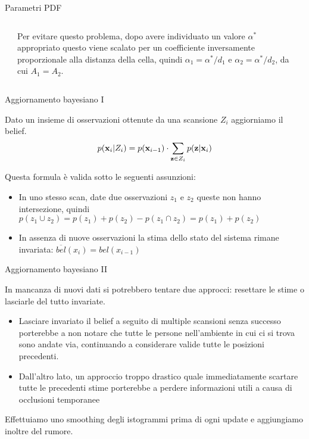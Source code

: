 \documentclass[aspectratio=169, leqno]{beamer}
\begin{document}
\begin{frame}[allowframebreaks]{Parametri PDF}
	\begin{columns}
		\begin{column}{0.005\linewidth} \end{column}
		\begin{column}{0.845\linewidth}
			\justifying
			Per evitare questo problema, dopo avere individuato un valore $
			\alpha ^* $ appropriato questo viene scalato per un coefficiente
			inversamente proporzionale alla distanza della cella, quindi $
			\alpha _1 = \alpha ^*/d_1 $ e $ \alpha _2=\alpha ^*/d_2 $, da cui
			$A_1=A_2$. 
		\end{column}
		\begin{column}{0.15\linewidth} \end{column}
	\end{columns}
	
	\end{frame}
	\begin{frame}{Aggiornamento bayesiano I}
	
	Dato un insieme di osservazioni ottenute da una scansione $ Z_i $ aggiorniamo il belief.
	\begin{equation}\label{eq:belief-update}
		p({\bf x}_i | Z_i) = p({\bf x}_{i-1}) \cdot 
		\sum_{{\bf z} \in Z_i} p({\bf z} | {\bf x}_i)
	\end{equation}

	Questa formula è valida sotto le seguenti assunzioni:
	\begin{itemize}
		\justifying
		\pause\item In uno stesso scan, date due osservazioni $z_1$ e
			$z_2$ queste non hanno intersezione, quindi $ p(z_1 \cup z_2) =
			p(z_1)+p(z_2)-p( z_1 \cap z_2) = p(z_1)+p(z_2) $ 

		\pause\item In assenza di nuove osservazioni la stima dello stato del sistema
			rimane invariata: $ \overline{bel}(x_i) = bel(x_{i-1}) $ 

	\end{itemize}
	
	\end{frame}
	\begin{frame}{Aggiornamento bayesiano II}

	In mancanza di nuovi dati si potrebbero tentare due approcci:
	resettare le stime o lasciarle del tutto invariate. 
	\begin{itemize} 
		\justifying
		\pause\item Lasciare invariato il belief a seguito di multiple scansioni
			senza successo porterebbe a non notare che tutte le persone
			nell'ambiente in cui ci si trova sono andate via, continuando a
			considerare valide tutte le posizioni precedenti.
		\pause\item Dall'altro lato, un approccio troppo drastico quale
			immediatamente scartare tutte le precedenti stime porterebbe a
			perdere informazioni utili a causa di occlusioni temporanee
	\end{itemize}
	
	\pause Effettuiamo uno smoothing degli istogrammi
	prima di ogni update e aggiungiamo inoltre del rumore. 
	
	\end{frame}
\end{document}
